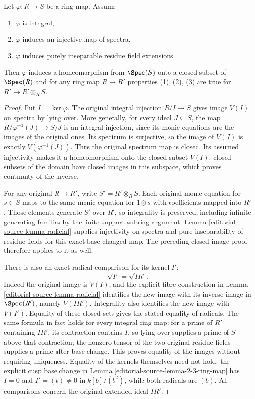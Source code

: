 \begin{lemma}
\label{editorial-source-lemma-radicial-integral}
Let $\varphi : R \to S$ be a ring map. Assume
\begin{enumerate}
\item $\varphi$ is integral,
\item $\varphi$ induces an injective map of spectra,
\item $\varphi$ induces purely inseparable residue field extensions.
\end{enumerate}
Then $\varphi$ induces a homeomorphism from $\Spec(S)$ onto a closed
subset of $\Spec(R)$ and for any ring map
$R \to R'$ properties (1), (2), (3) are true for $R' \to R' \otimes_R S$.
\end{lemma}

\begin{proof}
Put $I=\ker\varphi$. The original integral
injection $R/I\to S$ gives image $V(I)$
on spectra by lying over. More generally,
for every ideal $J\subseteq S$, the
map $R/\varphi^{-1}(J)\to S/J$ is an
integral injection, since its monic
equations are the images of the
original ones. Its spectrum is
surjective, so the image of $V(J)$
is exactly $V(\varphi^{-1}(J))$.
Thus the original spectrum map is
closed. Its assumed injectivity
makes it a homeomorphism onto
the closed subset $V(I)$: closed
subsets of the domain have closed
images in this subspace, which
proves continuity of the inverse.

For any original $R\to R'$, write
$S'=R'\otimes_R S$. Each original
monic equation for $s\in S$ maps
to the same monic equation for
$1\otimes s$ with coefficients
mapped into $R'$. Those elements
generate $S'$ over $R'$, so
integrality is preserved, including
infinite generating families by
the finite-support subring argument.
Lemma \ref{editorial-source-lemma-radicial} supplies
injectivity on spectra and pure
inseparability of residue fields
for this exact base-changed map.
The preceding closed-image proof
therefore applies to it as well.

There is also an exact radical
comparison for its kernel $I'$:
$$
\sqrt{I'}=\sqrt{IR'}.
$$
Indeed the original image is
$V(I)$, and the explicit fibre
construction in Lemma
\ref{editorial-source-lemma-radicial} identifies the
new image with its inverse image
in $\Spec(R')$, namely $V(IR')$.
Integrality also identifies the
new image with $V(I')$. Equality
of these closed sets gives the
stated equality of radicals.
The same formula in fact holds
for every integral ring map:
for a prime of $R'$ containing
$IR'$, its contraction contains
$I$, so lying over supplies a
prime of $S$ above that contraction;
the nonzero tensor of the two
original residue fields supplies
a prime after base change. This
proves equality of the images
without requiring uniqueness.
Equality of the kernels themselves
need not hold: the explicit cusp
base change in Lemma
\ref{editorial-source-lemma-2-3-ring-map} has $I=0$
and $I'=(b)\neq0$ in $k[b]/(b^2)$,
while both radicals are $(b)$.
All comparisons concern the
original extended ideal $IR'$.
\end{proof}